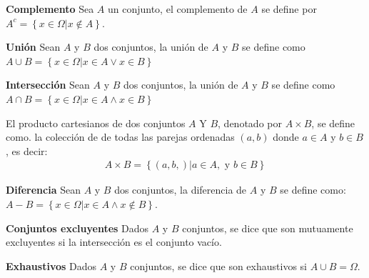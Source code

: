 \begin{Def} \textbf{Complemento}
Sea $A$ un conjunto, el complemento de $A$ se define por $A^{c}=\left\{x\in\Omega | x\notin A\right\}$.
\end{Def}


\begin{Def} \textbf{Uni\'on}
Sean $A$ y $B$ dos conjuntos, la uni\'on de $A$ y $B$ se define como $A\cup B=\left\{x\in\Omega | x\in A\vee  x\in B\right\}$
\end{Def}


\begin{Def} \textbf{Intersecci\'on}
Sean $A$ y $B$ dos conjuntos, la uni\'on de $A$ y $B$ se define como $A\cap B=\left\{x\in\Omega | x\in A\wedge  x\in B\right\}$
\end{Def}


\begin{Def}
El producto cartesianos de dos conjuntos $A$ Y $B$, denotado por $A\times B$, se define como. la colecci\'on de de todas las parejas ordenadas $\left(a,b\right)$ donde $a\in A$ y $b\in B$, es decir:
\begin{eqnarray*}
A\times B = \left\{\left(a,b,\right)|a\in A, \textrm{ y }b\in B\right\}
\end{eqnarray*}

\end{Def}



\begin{Def} \textbf{Diferencia}
Sean $A$ y $B$ dos conjuntos, la diferencia de $A$ y $B$ se define como: $A-B=\left\{x\in\Omega | x\in A \wedge x\notin B\right\}$.
\end{Def}


\begin{Def} \textbf{Conjuntos excluyentes}
Dados $A$ y $B$ conjuntos, se dice que son mutuamente excluyentes si la intersecci\'on es el conjunto vac\'io.
\end{Def}


\begin{Def} \textbf{Exhaustivos}
Dados $A$ y $B$ conjuntos, se dice que son exhaustivos si $A\cup B=\Omega$.
\end{Def}

